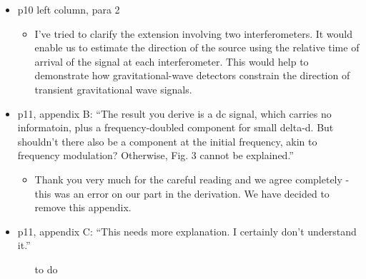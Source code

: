 \documentclass[a4paper, 10pt]{letter}
\begin{document}
\begin{itemize}
\item p10 left column, para 2
\begin{itemize}
\item I've tried to clarify the extension involving two interferometers. It would enable us to estimate the direction of the source using the relative time of arrival of the signal at each interferometer. This would help to demonstrate how gravitational-wave detectors constrain the direction of transient gravitational wave signals. 
\end{itemize}

\item p11, appendix B: ``The result you derive is a dc signal, which carries no informatoin, plus a frequency-doubled component for small delta-d. But shouldn't there also be a component at the initial frequency, akin to frequency modulation? Otherwise, Fig. 3 cannot be explained.''
\begin{itemize}
\item Thank you very much for the careful reading and we agree completely - this was an error on our part in the derivation. We have decided to remove this appendix. 
\end{itemize}

\item p11, appendix C: ``This needs more explanation. I certainly don't understand it.''
\begin{itemize}
\item [to do]
\end{itemize}

\end{itemize}
\end{document}
